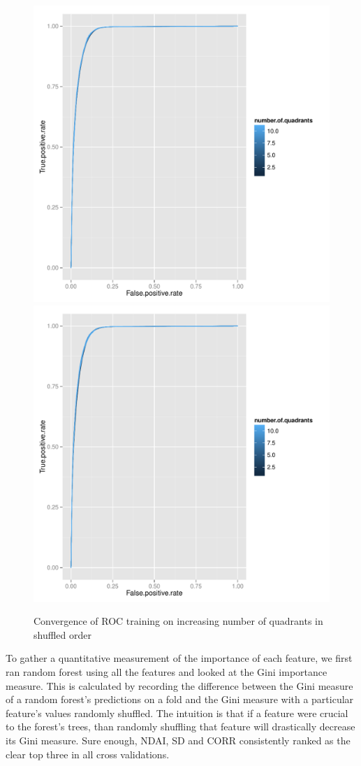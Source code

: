 \documentclass{article}\usepackage[]{graphicx}\usepackage[]{color}
\begin{document}
  \begin{figure}[H]
  \includegraphics[width=\linewidth, height = 180pts ]{ROC_converge_shuffle1.pdf}
\endminipage\hfill
{}
  \includegraphics[width=\linewidth, height = 180pts]{ROC_converge_shuffle2.pdf}
\endminipage\hfill
  \caption{Convergence of ROC training on increasing number of quadrants in shuffled order}\label{}
\end{figure}
  
To gather a quantitative measurement of the importance of each feature, we first ran random forest using all the features and looked at the Gini importance measure.  This is calculated by recording the difference between the Gini measure of a random forest's predictions on a fold and the Gini measure with a particular feature's values randomly shuffled.  The intuition is that if a feature were crucial to the forest's trees, than randomly shuffling that feature will drastically decrease its Gini measure.  Sure enough, NDAI, SD and CORR   consistently ranked as the clear top three in all cross validations. \\
\end{document}
